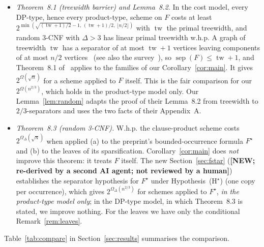 \documentclass[11pt,a4paper]{article}
\newcommand{\NEWR}{\textbf{[NEW; re-derived by a second AI agent; not reviewed by a human]}}
\theoremstyle{definition}
\theoremstyle{remark}
\newcommand{\sep}{\operatorname{sep}}
\newcommand{\tw}{\operatorname{tw}}
\begin{document}
\begin{itemize}
 \emph{Comparison, and where their bound is stronger.} Their bound charges \emph{measured
 groups}: a measured group may absorb all the foreign occurrences of its at most $s_t$
 variables, whatever its number of rows. Our Theorem~\ref{thm:general} charges \emph{rows}
 and gives $\rho_t>c_b\sep(F)/\sqrt{s_t}-q_t-1$ when $c_b\sep(F)/\sqrt{s_t}\le 2n/3-s_t$.
 \textbf{For small groups the bound of Dias and Lima is stronger than ours.} Indeed, if
 $\sqrt{s_t}\le1/c_b$ then $1/s_t\ge c_b/\sqrt{s_t}$, so
 \[
 \frac{\sep(F)-q_t}{s_t}\ \ge\ c_b\,\frac{\sep(F)}{\sqrt{s_t}}-q_t\ >\
 c_b\,\frac{\sep(F)}{\sqrt{s_t}}-q_t-1 ,
 \]
 and the conclusion of Theorem~\ref{thm:general} already holds at the point of their
 Lemma~6.2 (if $s_t>2n/3$ at that point, that conclusion is trivial). For $b=3$ we have $1/c_3=29.44\ldots$, so this is the case whenever
 $s_t\le866$ (for $b=2$: $s_t\le684$). Theorem~\ref{thm:general} says something that does
 not follow from \cite[Theorem~7.1(ii)]{DL} only for groups larger than $1/c_b^2$, where
 $c_b/\sqrt{s_t}>1/s_t$. In short: $\mu_ts_t\gtrsim n$ in~\cite{DL}, which needs
 $q_t\le\sep(F)/2$ (then $\mu_ts_t\ge\sep(F)/2$), against $\rho_t\sqrt{s_t}\gtrsim n$
 here, which needs $q_t+1\le c_b\sep(F)/(2\sqrt{s_t})$ and
 $c_b\sep(F)/\sqrt{s_t}\le2n/3-s_t$; both on formulas with $\sep(F)=\Omega(n)$, and at
 possibly different points $t$.
\item \emph{Theorem~8.1 (treewidth barrier) and Lemma~8.2.} In the cost model, every DP-type,
 hence every product-type, scheme on $F$ costs at least
 $2^{\min(\sqrt{(\tw+1)/2}-1,\,(\tw+1)/2,\,\lfloor n/2\rfloor)}$ with $\tw$ the primal
 treewidth, and random 3-CNF with $\Delta>3$ has linear primal treewidth w.h.p. A graph of
 treewidth $\tw$ has a separator of at most $\tw+1$ vertices leaving components of at most
 $n/2$ vertices~\cite{RS86} (see also the survey~\cite{Bod93}), so $\sep(F)\le\tw+1$, and Theorem~8.1 of~\cite{DL}
 applies to the families of our Corollary~\ref{cor:main}. It gives $2^{\Omega(\sqrt n)}$ for
 a scheme applied to $F$ itself. This is the fair comparison for our
 $2^{\Omega(n^{2/3})}$, which holds in the product-type model only.
 Our Lemma~\ref{lem:random} adapts the proof of their Lemma~8.2 from treewidth to
 $2/3$-separators and uses the two facts of their Appendix~A.
\item \emph{Theorem~8.3 (random 3-CNF).} W.h.p. the clause-product scheme costs
 $2^{\Omega_\Delta(\sqrt n)}$ when applied (a) to the preprint's bounded-occurrence formula
 $F^\star$ and (b) to the leaves of its sparsification. Corollary~\ref{cor:main} does
 \emph{not} improve this theorem: it treats $F$ itself. The new Section~\ref{sec:fstar}
 (\NEWR) establishes the separator hypothesis for $F^\star$ under Hypothesis~(H$^\star$)
 (one copy per occurrence), which gives $2^{\Omega_\Delta(n^{2/3})}$ for schemes applied to
 $F^\star$, \emph{in the product-type model only}; in the DP-type model, in which
 Theorem~8.3 is stated, we improve nothing. For the leaves we have only the conditional
 Remark~\ref{rem:leaves}.
\end{itemize}
Table~\ref{tab:compare} in Section~\ref{sec:results} summarises the comparison.
\end{document}
